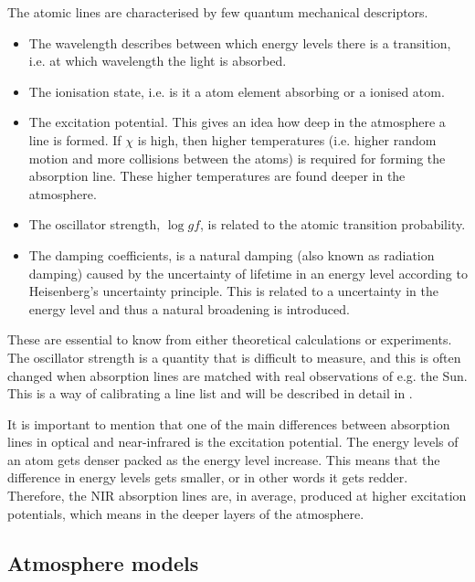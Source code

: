 The atomic lines are characterised by few quantum mechanical descriptors.
\begin{itemize}
  \item The wavelength describes between which energy levels there is a
        transition, i.e. at which wavelength the light is absorbed.
  \item The ionisation state, i.e. is it a atom element absorbing or a ionised
        atom.
  \item The excitation potential. This gives an idea how deep in the atmosphere
        a line is formed. If $\chi$ is high, then higher temperatures (i.e.
        higher random motion and more collisions between the atoms) is required
        for forming the absorption line. These higher temperatures are found
        deeper in the atmosphere.
  \item The oscillator strength, $\log \mathit{gf}$, is related to the atomic
        transition probability.
  \item The damping coefficients, is a natural damping (also known as radiation
        damping) caused by the uncertainty of lifetime in an energy level
        according to Heisenberg's uncertainty principle. This is related to a
        uncertainty in the energy level and thus a natural broadening is
        introduced.
\end{itemize}
These are essential to know from either theoretical calculations or experiments.
The oscillator strength is a quantity that is difficult to measure, and this
is often changed when absorption lines are matched with real observations of
e.g. the Sun. This is a way of calibrating a line list and will be described in
detail in .

It is important to mention that one of the main differences between absorption
lines in optical and near-infrared is the excitation potential. The energy
levels of an atom gets denser packed as the energy level increase. This means
that the difference in energy levels gets smaller, or in other words it gets
redder. Therefore, the NIR absorption lines are, in average, produced at higher
excitation potentials, which means in the deeper layers of the atmosphere.


\subsection{Atmosphere models}

